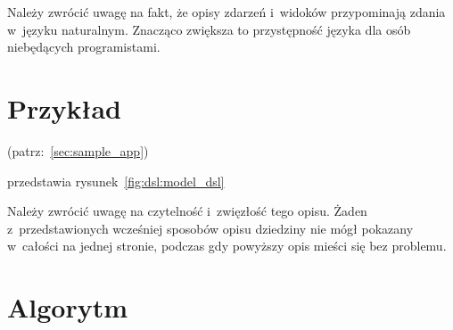 Należy zwrócić uwagę na fakt, że opisy zdarzeń i~widoków przypominają zdania w~języku naturalnym.
Znacząco zwiększa to przystępność języka dla osób niebędących programistami.


\section{Przykład}

(patrz:~\ref{sec:sample_app})

przedstawia rysunek~\ref{fig:dsl:model_dsl}


Należy zwrócić uwagę na czytelność i~zwięzłość tego opisu.
Żaden z~przedstawionych wcześniej sposobów opisu dziedziny nie mógł pokazany w~całości na jednej stronie, podczas gdy powyższy opis mieści się bez problemu.



\section{Algorytm}

